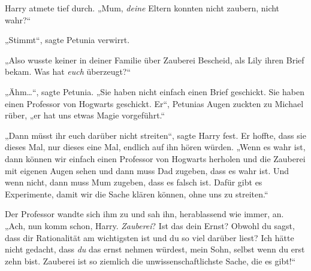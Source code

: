 Harry atmete tief durch. „Mum, \emph{deine} Eltern konnten nicht zaubern, nicht wahr?“

„Stimmt“, sagte Petunia verwirrt.

„Also wusste keiner in deiner Familie über Zauberei Bescheid, als Lily ihren Brief bekam. Was hat \emph{euch} überzeugt?“

„Ähm…“, sagte Petunia. „Sie haben nicht einfach einen Brief geschickt. Sie haben einen Professor von Hogwarts geschickt. Er“, Petunias Augen zuckten zu Michael rüber, „er hat uns etwas Magie vorgeführt.“

„Dann müsst ihr euch darüber nicht streiten“, sagte Harry fest. Er hoffte, dass sie dieses Mal, nur dieses eine Mal, endlich auf ihn hören würden. „Wenn es wahr ist, dann können wir einfach einen Professor von Hogwarts herholen und die Zauberei mit eigenen Augen sehen und dann muss Dad zugeben, dass es wahr ist. Und wenn nicht, dann muss Mum zugeben, dass es falsch ist. Dafür gibt es Experimente, damit wir die Sache klären können, ohne uns zu streiten.“

Der Professor wandte sich ihm zu und sah ihn, herablassend wie immer, an. „Ach, nun komm schon, Harry. \emph{Zauberei}? Ist das dein Ernst? Obwohl du sagst, dass dir Rationalität am wichtigsten ist und du so viel darüber liest? Ich hätte nicht gedacht, dass \emph{du} das ernst nehmen würdest, mein Sohn, selbst wenn du erst zehn bist. Zauberei ist so ziemlich die unwissenschaftlichste Sache, die es gibt!“

